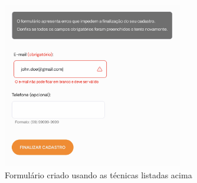 {\begin{itemize}
    \begin{figure}[ht]
  		\center
        \includegraphics[width=0.7\textwidth]{images/form-acessivel.png}
        \caption{Formulário criado usando as técnicas listadas acima}
    \end{figure} 
\end{itemize}
}
